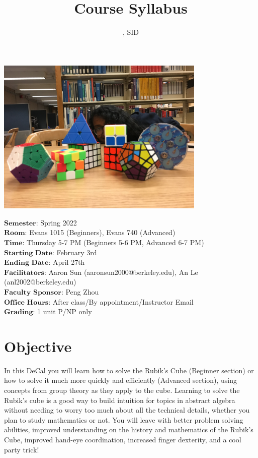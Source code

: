 \documentclass[11pt]{article}
\author{\Name, SID \SID}
\date{}
\begin{document}
\maketitle
\title{Course Syllabus}
\centerline{\includegraphics[width=10cm]{5.JPG}}

$\textbf{Semester}$: Spring 2022\\
$\textbf{Room}$: Evans 1015 (Beginners), Evans 740 (Advanced)\\
$\textbf{Time}$: Thursday 5-7 PM (Beginners 5-6 PM, Advanced 6-7 PM)\\
$\textbf{Starting Date}$: February 3rd \\
$\textbf{Ending Date}$: April 27th \\
$\textbf{Facilitators}$: Aaron Sun (aaronsun2000@berkeley.edu), An Le (anl2002@berkeley.edu) \\
$\textbf{Faculty Sponsor}$: Peng Zhou\\
$\textbf{Office Hours}$: After class/By appointment/Instructor Email \\
$\textbf{Grading}$: 1 unit P/NP only

\section*{Objective}
In this DeCal you will learn how to solve the Rubik’s Cube (Beginner section) or how to solve it much more quickly and efficiently (Advanced section), using concepts from group theory as they apply to the cube. Learning to solve the Rubik's cube is a good way to build intuition for topics in abstract algebra without needing to worry too much about all the technical details, whether you plan to study mathematics or not. You will leave with better problem solving abilities, improved understanding on the history and mathematics of the Rubik’s Cube, improved hand-eye coordination, increased finger dexterity, and a cool party trick!
\end{document}
